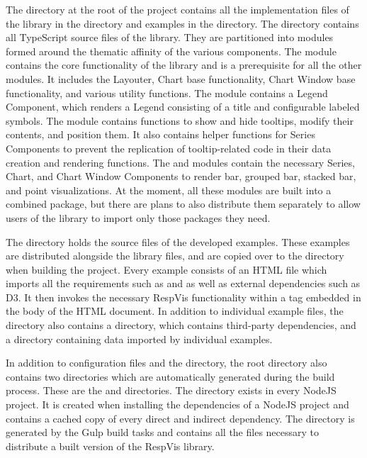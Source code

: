 The  directory at the root of the project contains all the
implementation files of the library in the  directory
and examples in the  directory. The
 directory contains all TypeScript source files of the
library. They are partitioned into modules formed around the thematic
affinity of the various components.
The  module contains the core functionality of the library
and is a prerequisite for all the other modules. It includes the
Layouter, Chart base functionality, Chart Window base functionality,
and various utility functions. The  module contains a
Legend Component, which renders a Legend consisting of a title and
configurable labeled symbols. The  module contains
functions to show and hide tooltips, modify their contents, and
position them. It also contains helper functions for Series Components
to prevent the replication of tooltip-related code in their data
creation and rendering functions. The  and 
modules contain the necessary Series, Chart, and Chart Window
Components to render bar, grouped bar, stacked bar, and point
visualizations. At the moment, all these modules are built into a
combined package, but there are plans to also distribute them
separately to allow users of the library to import only those packages
they need.

The  directory holds the source files of the
developed examples. These examples are distributed alongside the
library files, and are copied over to the 
directory when building the project. Every example consists of an HTML
file which imports all the requirements such as  and
 as well as external dependencies such as D3. It
then invokes the necessary RespVis functionality within a
 tag embedded in the body of the HTML document. In
addition to individual example files, the  directory
also contains a  directory, which contains third-party
dependencies, and a  directory containing data imported by
individual examples.

In addition to configuration files and the  directory, the
root directory also contains two directories which are automatically
generated during the build process. These are the 
and  directories. The  directory
exists in every NodeJS project. It is created when installing the
dependencies of a NodeJS project and contains a cached copy of every
direct and indirect dependency. The  directory is
generated by the Gulp build tasks and contains all the files necessary
to distribute a built version of the RespVis library.

